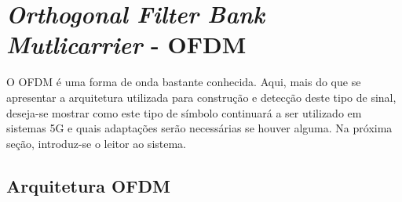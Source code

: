\chapter{\textit{Orthogonal Filter Bank Mutlicarrier} - OFDM} \label{capitulo2}

O OFDM é uma forma de onda bastante conhecida. Aqui, mais do que se apresentar a arquitetura utilizada para construção e detecção deste tipo de sinal, deseja-se mostrar como este tipo de símbolo continuará a ser utilizado em sistemas 5G e quais adaptações serão necessárias se houver alguma. Na próxima seção, introduz-se o leitor ao sistema. 

\section{Arquitetura OFDM}\label{pulso} 

